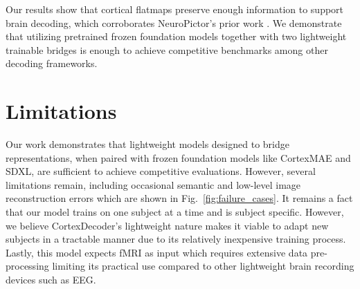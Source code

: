\documentclass[letterpaper]{article} %
\begin{document}
Our results show that cortical flatmaps preserve enough information to support brain decoding, which corroborates NeuroPictor's prior work \cite{huo2024neuropictorrefiningfmritoimagereconstruction}. We demonstrate that utilizing pretrained frozen foundation models together with two lightweight trainable bridges is enough to achieve competitive benchmarks among other decoding frameworks.

\section{Limitations}
\label{sec:limitations}
Our work demonstrates that lightweight models designed to bridge representations, when paired with frozen foundation models like CortexMAE and SDXL, are sufficient to achieve competitive evaluations. However, several limitations remain, including occasional semantic and low-level image reconstruction errors which are shown in Fig.~\ref{fig:failure_cases}. It remains a fact that our model trains on one subject at a time and is  subject specific. However, we believe CortexDecoder's lightweight nature makes it viable to adapt new subjects in a tractable manner due to its relatively inexpensive training process. Lastly, this model expects fMRI as input which requires extensive data pre-processing limiting its practical use compared to other lightweight brain recording devices such as EEG.




\appendix
\end{document}
